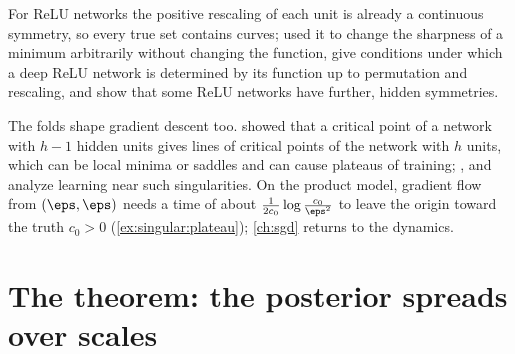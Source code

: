 \begin{refsection}

For ReLU networks the positive rescaling of each unit is already a continuous symmetry, so every true set contains curves; \textcite{DinhEtAl2017} used it to change the sharpness of a minimum arbitrarily without changing the function, \textcite{BonaPellissierEtAl2023} give conditions under which a deep ReLU network is determined by its function up to permutation and rescaling, and \textcite{GrigsbyEtAl2023} show that some ReLU networks have further, hidden symmetries.

The folds shape gradient descent too. \Textcite{FukumizuAmari2000} showed that a critical point of a network with $h-1$ hidden units gives lines of critical points of the network with $h$ units, which can be local minima or saddles and can cause plateaus of training; \textcite{AmariEtAl2006}, \textcite{WeiEtAl2008} and \textcite{CousseauEtAl2008} analyze learning near such singularities. On the product model, gradient flow from $(\eps,\eps)$ needs a time of about $\frac1{2c_0}\log\frac{c_0}{\eps^2}$ to leave the origin toward the truth $c_0>0$ (\cref{ex:singular:plateau}); \cref{ch:sgd} returns to the dynamics.

\section{The theorem: the posterior spreads over scales}\label{sec:singular:scales}


\end{refsection}
